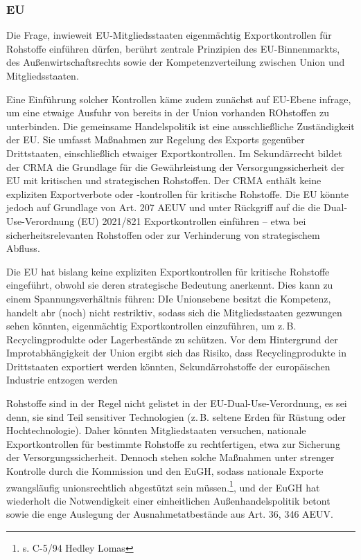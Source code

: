 \documentclass[12pt,a4paper,oneside]{book} %
\begin{document}
\subsubsection{EU}

Die Frage, inwieweit EU-Mitgliedsstaaten eigenmächtig Exportkontrollen für Rohstoffe einführen dürfen, berührt zentrale Prinzipien des EU-Binnenmarkts, des Außenwirtschaftsrechts sowie der Kompetenzverteilung zwischen Union und Mitgliedsstaaten.

Eine Einführung solcher Kontrollen käme zudem zunächst auf EU-Ebene infrage, um eine etwaige Ausfuhr von bereits in der Union vorhanden ROhstoffen zu unterbinden. Die gemeinsame Handelspolitik ist eine ausschließliche Zuständigkeit der EU. Sie umfasst Maßnahmen zur Regelung des Exports gegenüber Drittstaaten, einschließlich etwaiger Exportkontrollen. Im Sekundärrecht bildet der CRMA die Grundlage für die Gewährleistung der Versorgungssicherheit der EU mit kritischen und strategischen Rohstoffen. Der CRMA enthält keine expliziten Exportverbote oder -kontrollen für kritische Rohstoffe. Die EU könnte jedoch auf Grundlage von Art. 207 AEUV und unter Rückgriff auf die die Dual-Use-Verordnung (EU) 2021/821 Exportkontrollen einführen – etwa bei sicherheitsrelevanten Rohstoffen oder zur Verhinderung von strategischem Abfluss.

Die EU hat bislang keine expliziten Exportkontrollen für kritische Rohstoffe eingeführt, obwohl sie deren strategische Bedeutung anerkennt. Dies kann zu einem Spannungsverhältnis führen: DIe Unionsebene besitzt die Kompetenz, handelt abr (noch) nicht restriktiv, sodass sich die Mitgliedsstaaten gezwungen  sehen könnten, eigenmächtig Exportkontrollen einzuführen, um z. B. Recyclingprodukte oder Lagerbestände zu schützen. Vor dem Hintergrund der Improtabhängigkeit der Union ergibt sich das Risiko, dass Recyclingprodukte in Drittstaaten exportiert werden könnten, Sekundärrohstoffe der europäischen Industrie entzogen werden

Rohstoffe sind in der Regel nicht gelistet in der EU-Dual-Use-Verordnung, es sei denn, sie sind Teil sensitiver Technologien (z. B. seltene Erden für Rüstung oder Hochtechnologie). Daher könnten Mitgliedstaaten versuchen, nationale Exportkontrollen für bestimmte Rohstoffe zu rechtfertigen, etwa zur Sicherung der Versorgungssicherheit. Dennoch stehen solche Maßnahmen unter strenger Kontrolle durch die Kommission und den EuGH, sodass nationale Exporte zwangsläufig unionsrechtlich abgestützt sein müssen.\footnote{s. C-5/94 Hedley Lomas}, und der EuGH hat wiederholt die Notwendigkeit einer einheitlichen Außenhandelspolitik betont sowie die enge Auslegung der Ausnahmetatbestände aus Art. 36, 346 AEUV.
\end{document}
